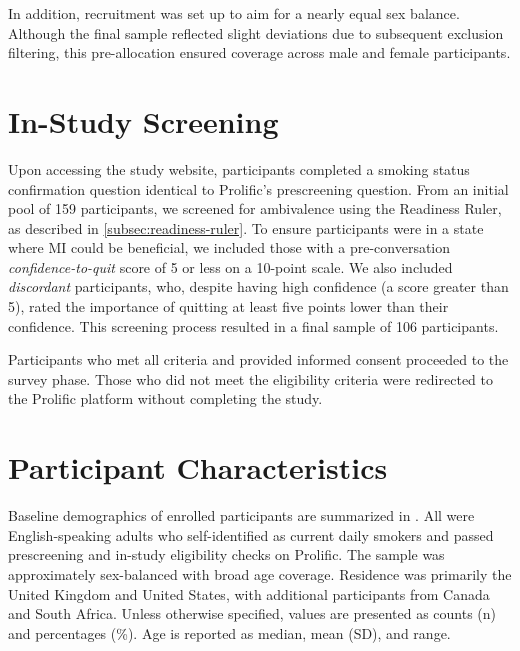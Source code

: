 In addition, recruitment was set up to aim for a nearly equal sex balance. Although the
final sample reflected slight deviations due to subsequent exclusion filtering, this
pre-allocation ensured coverage across male and female participants.

\section{In-Study Screening}
Upon accessing the study website, participants completed a smoking status confirmation
question identical to Prolific's prescreening question. From an initial pool of 159
participants, we screened for ambivalence using the Readiness Ruler, as described in
\cref{subsec:readiness-ruler}. To ensure participants were in a state where MI could be
beneficial, we included those with a pre-conversation \emph{confidence-to-quit} score
of 5 or less on a 10-point scale. We also included \emph{discordant} participants, who,
despite having high confidence (a score greater than 5), rated the importance of
quitting at least five points lower than their confidence. This screening process
resulted in a final sample of 106 participants.

Participants who met all criteria and provided informed consent proceeded to the survey
phase. Those who did not meet the eligibility criteria were redirected to the Prolific
platform without completing the study.

\section{Participant Characteristics}
\label{subsec:participant-characteristics}
\noindent Baseline demographics of enrolled participants are summarized in . All were English-speaking adults who self-identified as current daily smokers and passed prescreening and in-study eligibility checks on Prolific. The sample was approximately sex-balanced with broad age coverage. Residence was primarily the United Kingdom and United States, with additional participants from Canada and South Africa. Unless otherwise specified, values are presented as counts (n) and percentages (\%). Age is reported as median, mean (SD), and range.


